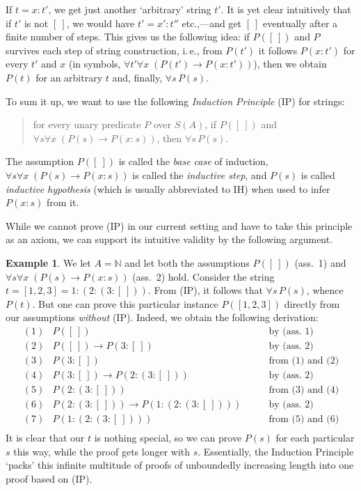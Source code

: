 \documentclass[12pt,notitlepage]{article}
\theoremstyle{plain}
\theoremstyle{definition}
\newtheorem{exm}[thm]{Example}
\theoremstyle{plain}
\newcommand{\N}{\mathbb{N}}
\newcommand{\1}{\mathbf{1}}
\newcommand{\0}{\mathbf{0}}
\begin{document}
If $t = x : t'$, we get just another `arbitrary' string $t'$. It is yet clear intuitively that if $t'$ is not $[\ ]$, we would have  $t' = x' : t''$ etc.,---and get $[\ ]$ eventually after a finite number of steps. This gives us the following idea: if $P([\ ])$ and $P$ survives each step of string construction, i.\,e., from $P(t')$ it follows $P(x : t')$ for every $t'$ and $x$ (in symbols, $\forall t' \forall x\; (P(t') \to P(x:t'))$), then we obtain $P( t )$ for an arbitrary $t$ and, finally, $\forall s\, P(s)$.

To sum it up, we want to use the following \emph{Induction Principle} (IP) for strings:
\begin{quote}
for every unary predicate $P$ over $S(A)$, if $P([\ ])$ and  $\forall s \forall x\; (P(s) \to P(x:s))$, then $\forall s\, P(s)$.
\end{quote}
The assumption $P([\ ])$ is called the \emph{base case} of induction, $\forall s \forall x\; (P(s) \to P(x:s))$ is called the \emph{inductive step}, and $P(s)$ is called \emph{inductive hypothesis} (which is usually abbreviated to IH) when used to infer $P(x:s)$ from it.

While we cannot prove (IP) in our current setting and have to take this principle as an axiom, we can support its intuitive validity by the following argument.
\begin{exm}\label{strings:ind_intuition}
We let $A = \N$ and let both the assumptions $P([\ ])$ (ass.~1) and  $\forall s \forall x\; (P(s) \to P(x:s))$ (ass.~2) hold. Consider the string $t = [1,2,3] = 1 : (2 : (3 : [\ ]))$. From (IP), it follows that $\forall s\, P(s)$, whence $P(t)$. But one can prove this particular instance $P([1,2,3])$ directly from our assumptions \emph{without} (IP). Indeed, we obtain the following derivation:
$$
\begin{array}{rll}
(1)&P([\ ])&\qquad\mbox{by (ass.~1)}\\
(2)&P([\ ]) \to P(3 : [\ ])&\qquad\mbox{by (ass.~2)}\\
(3)&P(3 : [\ ])&\qquad\mbox{from (1) and (2)}\\
(4)&P(3 : [\ ]) \to P(2 : (3 : [\ ]))&\qquad\mbox{by (ass.~2)}\\
(5)&P(2 : (3 : [\ ]))&\qquad\mbox{from (3) and (4)}\\
(6)&P(2 : (3 : [\ ])) \to P(1 : (2 : (3 : [\ ])))&\qquad\mbox{by (ass.~2)}\\
(7)&P(1 : (2 : (3 : [\ ])))&\qquad\mbox{from (5) and (6)}\\
\end{array}
$$
It is clear that our $t$ is nothing special, so we can prove $P(s)$ for each particular $s$ this way, while the proof gets longer with $s$. Essentially, the Induction Principle `packs' this infinite multitude of proofs of unboundedly increasing length into one proof based on (IP).
\end{exm} 
\end{document}
